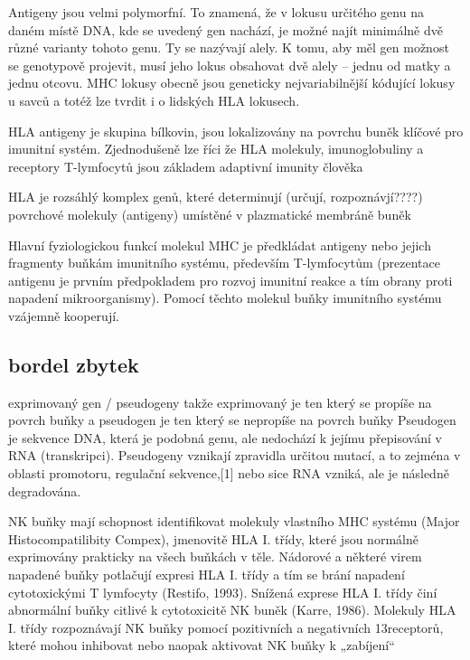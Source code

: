 \documentclass[czech,DP]{thesiskiv}
\begin{document}
Antigeny jsou velmi polymorfní. To znamená, že v lokusu určitého genu na daném
místě DNA, kde se uvedený gen nachází, je možné najít minimálně dvě různé varianty tohoto
genu. Ty se nazývají alely. K tomu, aby měl gen možnost se genotypově projevit, musí jeho
lokus obsahovat dvě alely – jednu od matky a jednu otcovu.
MHC lokusy obecně jsou
geneticky nejvariabilnější kódující lokusy u savců a totéž lze tvrdit i o lidských HLA
lokusech.

HLA antigeny je skupina bílkovin, jsou lokalizovány na povrchu buněk klíčové pro imunitní systém.
Zjednodušeně lze říci že HLA molekuly, imunoglobuliny a receptory T-lymfocytů jsou základem adaptivní imunity člověka

HLA je rozsáhlý komplex genů, které determinují (určují, rozpoznávjí????) povrchové molekuly (antigeny) umístěné v plazmatické membráně buněk

Hlavní fyziologickou funkcí molekul MHC je předkládat antigeny nebo jejich fragmenty buňkám imunitního systému, především T-lymfocytům (prezentace antigenu je prvním předpokladem pro rozvoj imunitní reakce a tím obrany proti napadení mikroorganismy). Pomocí těchto molekul buňky imunitního systému vzájemně kooperují.

\subsection{bordel zbytek}



exprimovaný gen / pseudogeny
takže exprimovaný je ten který se propíše na povrch buňky a pseudogen je ten který se nepropíše na povrch buňky
Pseudogen je sekvence DNA, která je podobná genu, ale nedochází k jejímu přepisování v RNA (transkripci). Pseudogeny vznikají zpravidla určitou mutací, a to zejména v oblasti promotoru, regulační sekvence,[1] nebo sice RNA vzniká, ale je následně degradována.


NK buňky mají schopnost identifikovat molekuly vlastního MHC systému (Major
Histocompatilibity Compex), jmenovitě HLA I. třídy, které jsou normálně exprimovány
prakticky na všech buňkách v těle. Nádorové a některé virem napadené buňky potlačují
expresi HLA I. třídy a tím se brání napadení cytotoxickými T lymfocyty (Restifo, 1993).
Snížená exprese HLA I. třídy činí abnormální buňky citlivé k cytotoxicitě NK buněk (Karre,
1986). Molekuly HLA I. třídy rozpoznávají NK buňky pomocí pozitivních a negativních
13receptorů, které mohou inhibovat nebo naopak aktivovat NK buňky k „zabíjení“
\end{document}
